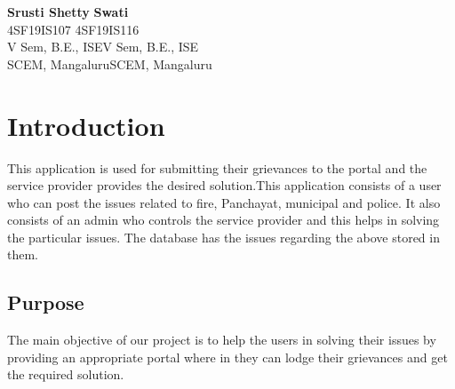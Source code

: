 \documentclass[12pt,a4paper]{report}
\begin{document}
\begin{flushright}
\textbf{Srusti Shetty}\hspace{10.9cm} \textbf{Swati}\\
\hspace{0.6in}4SF19IS107 \hspace{3.80in}4SF19IS116\\
V Sem, B.E., ISE\hspace{8.7cm}V Sem, B.E., ISE\\
SCEM, Mangaluru\hspace{8.4cm}SCEM, Mangaluru\\
\end{flushright}

\renewcommand{\contentsname}{Table of Contents}
\tableofcontents
{}
\listoffigures
{}
\newpage

\pagestyle{fancy}
\fancyhf{}
\renewcommand{\headrulewidth}{0.5pt}
\renewcommand{\footrulewidth}{0.5pt}

\chapter{Introduction}
\par
This application is used for submitting their grievances to the portal and the service provider provides the desired solution.This application  consists of a user who can post the issues related to fire, Panchayat, municipal and police. It also consists of an admin who controls the service provider and this helps in solving the particular issues. The database has the issues regarding the above stored in them.

\par
\section{Purpose}
The main objective of our project is to help the users in solving their issues by providing an appropriate portal where in they can lodge their grievances and get the required solution.
\end{document}
